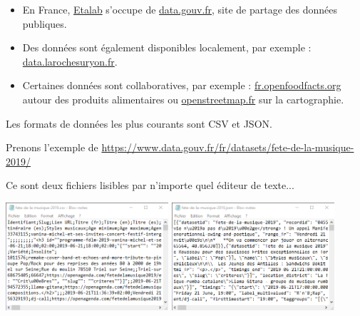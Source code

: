 
\begin{itemize}
	\item En France, \href{https://www.etalab.gouv.fr/}{Etalab} s'occupe de \href{https://www.data.gouv.fr/fr/}{data.gouv.fr}, site de partage des données publiques.
	
	\item Des données sont également disponibles localement, par exemple : \href{data.larochesuryon.fr}{data.larochesuryon.fr}.
    \item Certaines données sont collaboratives, par exemple : \href{https://fr.openfoodfacts.org/}{fr.openfoodfacts.org} autour des produits alimentaires ou \href{https://www.openstreetmap.fr/}{openstreetmap.fr} sur la cartographie.
\end{itemize}

Les formats de données les plus courants sont CSV et JSON.

Prenons l'exemple de \href{https://www.data.gouv.fr/fr/datasets/fete-de-la-musique-2019/}{https://www.data.gouv.fr/fr/datasets/fete-de-la-musique-2019/}

Ce sont deux fichiers lisibles par n'importe quel éditeur de texte... 
	
	{\centering\includegraphics[height=4cm]{images/fetecsv.png} \qquad \includegraphics[height=4cm]{images/fetejson.png}\par}
	
